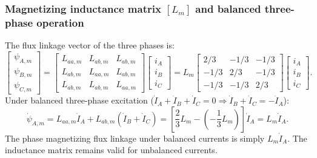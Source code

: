 \subsubsection{Magnetizing inductance matrix $[L_m]$ and balanced three-phase operation}
The flux linkage vector of the three phases is:
\[
\begin{bmatrix}
\psi_{A,m} \\
\psi_{B,m} \\
\psi_{C,m}
\end{bmatrix}
=
\begin{bmatrix}
L_{aa,m} & L_{ab,m} & L_{ab,m} \\
L_{ab,m} & L_{aa,m} & L_{ab,m} \\
L_{ab,m} & L_{ab,m} & L_{aa,m}
\end{bmatrix}
\begin{bmatrix}
i_A \\
i_B \\
i_C
\end{bmatrix}
= L_m
\begin{bmatrix}
2/3 & -1/3 & -1/3 \\
-1/3 & 2/3 & -1/3 \\
-1/3 & -1/3 & 2/3
\end{bmatrix}
\begin{bmatrix}
i_A \\
i_B \\
i_C
\end{bmatrix}.
\]
Under balanced three-phase excitation (\(\dot{I}_A + \dot{I}_B + \dot{I}_C = 0 \Rightarrow \dot{I}_B + \dot{I}_C = -\dot{I}_A\)):
\[
\dot{\psi}_{A,m} = L_{aa,m}\dot{I}_A + L_{ab,m}(\dot{I}_B + \dot{I}_C)
= \left[ \frac{2}{3}L_m - \left(-\frac{1}{3}L_m\right) \right]\dot{I}_A
= L_m\dot{I}_A.
\]
The phase magnetizing flux linkage under balanced currents is simply \(L_m \dot{I}_A\). The inductance matrix remains valid for unbalanced currents.
